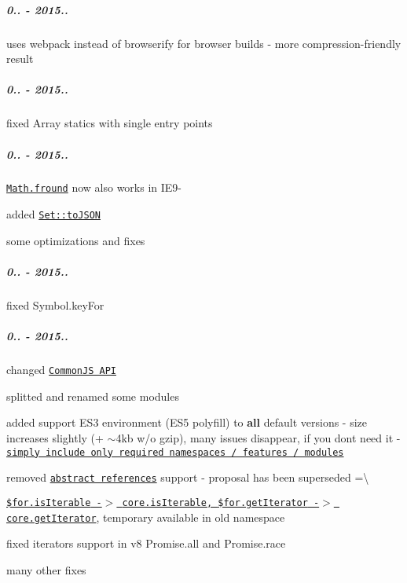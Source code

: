 \subparagraph*{0.. -\/ 2015..}


\begin{DoxyItemize}
\item uses {\ttfamily webpack} instead of {\ttfamily browserify} for browser builds -\/ more compression-\/friendly result
\end{DoxyItemize}

\subparagraph*{0.. -\/ 2015..}


\begin{DoxyItemize}
\item fixed {\ttfamily Array} statics with single entry points
\end{DoxyItemize}

\subparagraph*{0.. -\/ 2015..}


\begin{DoxyItemize}
\item \href{https://github.com/zloirock/core-js/#ecmascript-6-math}{\tt {\ttfamily Math.\+fround}} now also works in I\+E9-\/
\item added \href{https://github.com/zloirock/core-js/#ecmascript-7-proposals}{\tt {\ttfamily Set\+::to\+J\+S\+ON}}
\item some optimizations and fixes
\end{DoxyItemize}

\subparagraph*{0.. -\/ 2015..}


\begin{DoxyItemize}
\item fixed {\ttfamily Symbol.\+key\+For}
\end{DoxyItemize}

\subparagraph*{0.. -\/ 2015..}


\begin{DoxyItemize}
\item changed \href{https://github.com/zloirock/core-js/#commonjs}{\tt Common\+JS A\+PI}
\item splitted and renamed some modules
\item added support E\+S3 environment (E\+S5 polyfill) to {\bfseries all} default versions -\/ size increases slightly (+ $\sim$4kb w/o gzip), many issues disappear, if you don\textquotesingle{}t need it -\/ \href{https://github.com/zloirock/core-js/#commonjs}{\tt simply include only required namespaces / features / modules}
\item removed \href{https://github.com/zenparsing/es-abstract-refs}{\tt abstract references} support -\/ proposal has been superseded =\textbackslash{}
\item \href{https://github.com/zloirock/core-js/#ecmascript-6-iterators}{\tt {\ttfamily \$for.\+is\+Iterable} -\/$>$ {\ttfamily core.\+is\+Iterable}, {\ttfamily \$for.\+get\+Iterator} -\/$>$ {\ttfamily core.\+get\+Iterator}}, temporary available in old namespace
\item fixed iterators support in v8 {\ttfamily Promise.\+all} and {\ttfamily Promise.\+race}
\item many other fixes
\end{DoxyItemize}

